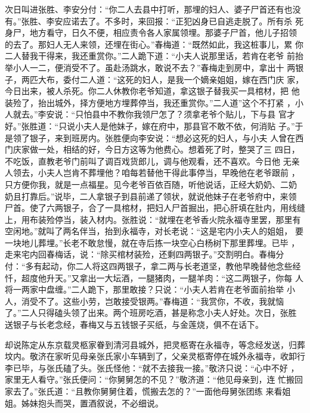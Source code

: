 次日叫进张胜、李安分付：“你二人去县中打听，那埋的妇人、婆子尸首还有也没
有。”张胜、李安应诺去了。不多时，来回报：“正犯凶身已自逃走脱了。所有杀
死身尸，地方看守，日久不便，相应责令各人家属领埋。那婆子尸首，他儿子招领
的去了。那妇人无人来领，还埋在街心。”春梅道：“既然如此，我这桩事儿，累
你二人替我干得来，我还重赏你。”二人跪下道：“小夫人说那里话，若肯在老爷
前抬举小人一二，便消受不了。虽赴汤跳水，敢说不去？”春梅走到房中，拿出十
两银子，两匹大布，委付二人道：“这死的妇人，是我一个嫡亲姐姐，嫁在西门庆
家，今日出来，被人杀死。你二人休教你老爷知道，拿这银子替我买一具棺材，把
他装殓了，抬出城外，择方便地方埋葬停当，我还重赏你。”二人道”这个不打紧
，小人就去。”李安说：“只怕县中不教你我领尸怎了？须拿老爷个贴儿，下与县
官才好。”张胜道：“只说小夫人是他妹子，嫁在府中，那县官不敢不依，何消贴
子。”于是领了银子，来到班房内。张胜便向李安说：“想必这死的妇人，与小夫
人曾在西门庆家做一处，相结的好，今日方这等为他费心。想着死了时，整哭了三
四日，不吃饭，直教老爷门前叫了调百戏货郎儿，调与他观看，还不喜欢。今日他
无亲人领去，小夫人岂肯不葬埋他？咱每若替他干得此事停当，早晚他在老爷跟前
，只方便你我，就是一点福星。见今老爷百依百随，听他说话，正经大奶奶、二奶
奶且打靠后。”说毕，二人拿银子到县前递了领状，就说他妹子在老爷府中，来领
尸首。使了六两银子，合了一具棺材，把妇人尸首掘出，把心肝填在肚内，用线缝
上，用布装殓停当，装入材内。张胜说：“就埋在老爷香火院永福寺里罢，那里有
空闲地。”就叫了两名伴当，抬到永福寺，对长老说：“这是宅内小夫人的姐姐，
要一块地儿葬埋。”长老不敢怠慢，就在寺后拣一块空心白杨树下那里葬埋。已毕
，走来宅内回春梅话，说：“除买棺材装殓，还剩四两银子。”交割明白。春梅分
付：“多有起动，你二人将这四两银子，拿二两与长老道坚，教他早晚替他念些经
忏，超度他升天。”又拿出一大坛酒，一腿猪肉，一腿羊肉：“这二两银子，你每
人将一两家中盘缠。”二人跪下，那里敢接？只说：“小夫人若肯在老爷面前抬举
小人，消受不了。这些小劳，岂敢接受银两。”春梅道：“我赏你，不收，我就恼
了。”二人只得磕头领了出来。两个班房吃酒，甚是称念小夫人好处。次日，张胜
送银子与长老念经，春梅又与五钱银子买纸，与金莲烧，俱不在话下。

却说陈定从东京载灵柩家眷到清河县城外，把灵柩寄在永福寺，等念经发送，归葬
坟内。敬济在家听见母亲张氏家小车辆到了，父亲灵柩寄停在城外永福寺，收卸行
李已毕，与张氏磕了头。张氏怪他：“就不去接我一接。”敬济只说：“心中不好
，家里无人看守。”张氏便问：“你舅舅怎的不见？”敬济道：“他见母亲到，连
忙搬回家去了。”张氏道：“且教你舅舅住着，慌搬去怎的？”一面他母舅张团练
来看姐姐。姊妹抱头而哭，置酒叙说，不必细说。


